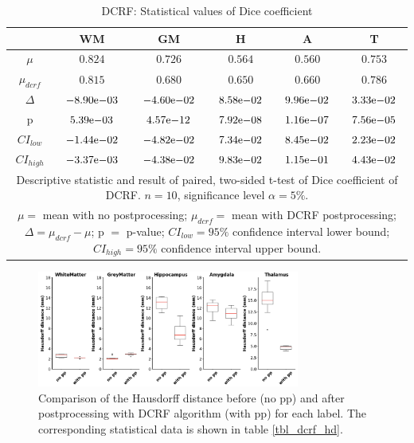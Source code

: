 \documentclass[journal]{IEEEtran}
\begin{document}
\begin{table}[ht]
\renewcommand{\arraystretch}{1.3}
\caption{DCRF: Statistical values of Dice coefficient}
\label{tbl_dcrf_dice}
\centering
\tabcolsep=0.11cm
\begin{tabular}{c|c|c|c|c|c}
\hline
 & WM & GM & H & A & T\\
\hline
$\mu$&$0.824$&$0.726$&$0.564$&$0.560$&$0.753$\\
$\mu_{dcrf}$&$0.815$&$0.680$&$0.650$&$0.660$&$0.786$\\
$\Delta$&${-8.90}\mathrm{e}{-03}$&${-4.60}\mathrm{e}{-02}$&${8.58}\mathrm{e}{-02}$&${9.96}\mathrm{e}{-02}$&${3.33}\mathrm{e}{-02}$\\
p&${5.39}\mathrm{e}{-03}$&${4.57}\mathrm{e}{-12}$&${7.92}\mathrm{e}{-08}$&${1.16}\mathrm{e}{-07}$&${7.56}\mathrm{e}{-05}$\\
$CI_{low}$&${-1.44}\mathrm{e}{-02}$&${-4.82}\mathrm{e}{-02}$&${7.34}\mathrm{e}{-02}$&${8.45}\mathrm{e}{-02}$&${2.23}\mathrm{e}{-02}$\\
$CI_{high}$&${-3.37}\mathrm{e}{-03}$&${-4.38}\mathrm{e}{-02}$&${9.83}\mathrm{e}{-02}$&${1.15}\mathrm{e}{-01}$&${4.43}\mathrm{e}{-02}$\\
\hline
\multicolumn{6}{p{3.4in}}{Descriptive statistic and result of paired, two-sided t-test of Dice coefficient of DCRF. $n=10$, significance level $\alpha = 5\%$. }\\
\multicolumn{6}{p{3.4in}}{$\mu=$ mean with no postprocessing; $\mu_{dcrf}=$ mean with DCRF postprocessing; $\Delta=\mu_{dcrf}-\mu$; p $=$ p-value;  $CI_{low}= 95\%$ confidence interval lower bound; $CI_{high}= 95\%$ confidence interval upper bound.}\\

\end{tabular}
\end{table}



\begin{figure}[h!]
\centering
\includegraphics[width=3.4in]{img/boxplots/DCRF-HD.png}
\caption{Comparison of the Hausdorff distance before (no pp) and after postprocessing with DCRF algorithm (with pp) for each label. The corresponding statistical data is shown in table \ref{tbl_dcrf_hd}.}
\label{fig_dcrf-hd}
\end{figure}
\end{document}
